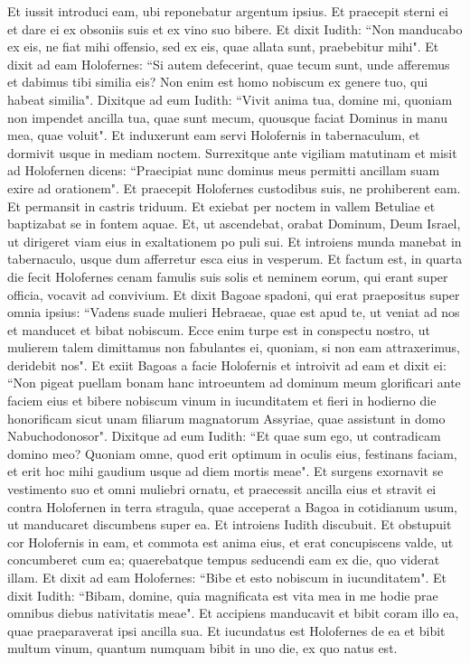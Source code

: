 \begin{biblechapter}  
\verse Et iussit introduci eam, ubi reponebatur argentum ipsius. Et praecepit sterni ei et dare ei ex obsoniis suis et ex vino suo bibere. 
\verse Et dixit Iudith: “Non manducabo ex eis, ne fiat mihi offensio, sed ex eis, quae allata sunt, praebebitur mihi". 
\verse Et dixit ad eam Holofernes: “Si autem defecerint, quae tecum sunt, unde afferemus et dabimus tibi similia eis? Non enim est homo nobiscum ex genere tuo, qui habeat similia". 
\verse Dixitque ad eum Iudith: “Vivit anima tua, domine mi, quoniam non impendet ancilla tua, quae sunt mecum, quousque faciat Dominus in manu mea, quae voluit". 
\verse Et induxerunt eam servi Holofernis in tabernaculum, et dormivit usque in mediam noctem. Surrexitque ante vigiliam matutinam 
\verse et misit ad Holofernen dicens: “Praecipiat nunc dominus meus permitti ancillam suam exire ad orationem". 
\verse Et praecepit Holofernes custodibus suis, ne prohiberent eam. Et permansit in castris triduum. Et exiebat per noctem in vallem Betuliae et baptizabat se in fontem aquae. 
\verse Et, ut ascendebat, orabat Dominum, Deum Israel, ut dirigeret viam eius in exaltationem po puli sui. 
\verse Et introiens munda manebat in tabernaculo, usque dum afferretur esca eius in vesperum. 
\verse Et factum est, in quarta die fecit Holofernes cenam famulis suis solis et neminem eorum, qui erant super officia, vocavit ad convivium. 
\verse Et dixit Bagoae spadoni, qui erat praepositus super omnia ipsius: “Vadens suade mulieri Hebraeae, quae est apud te, ut veniat ad nos et manducet et bibat nobiscum.  
\verse Ecce enim turpe est in conspectu nostro, ut mulierem talem dimittamus non fabulantes ei, quoniam, si non eam attraxerimus, deridebit nos". 
\verse Et exiit Bagoas a facie Holofernis et introivit ad eam et dixit ei: “Non pigeat puellam bonam hanc introeuntem ad dominum meum glorificari ante faciem eius et bibere nobiscum vinum in iucunditatem et fieri in hodierno die honorificam sicut unam filiarum magnatorum Assyriae, quae assistunt in domo Nabuchodonosor".  
\verse Dixitque ad eum Iudith: “Et quae sum ego, ut contradicam domino meo? Quoniam omne, quod erit optimum in oculis eius, festinans faciam, et erit hoc mihi gaudium usque ad diem mortis meae". 
\verse Et surgens exornavit se vestimento suo et omni muliebri ornatu, et praecessit ancilla eius et stravit ei contra Holofernen in terra stragula, quae acceperat a Bagoa in cotidianum usum, ut manducaret discumbens super ea. 
\verse Et introiens Iudith discubuit. Et obstupuit cor Holofernis in eam, et commota est anima eius, et erat concupiscens valde, ut concumberet cum ea; quaerebatque tempus seducendi eam ex die, quo viderat illam. 
\verse Et dixit ad eam Holofernes: “Bibe et esto nobiscum in iucunditatem". 
\verse Et dixit Iudith: “Bibam, domine, quia magnificata est vita mea in me hodie prae omnibus diebus nativitatis meae". 
\verse Et accipiens manducavit et bibit coram illo ea, quae praeparaverat ipsi ancilla sua. 
\verse Et iucundatus est Holofernes de ea et bibit multum vinum, quantum numquam bibit in uno die, ex quo natus est. 
\end{biblechapter}

